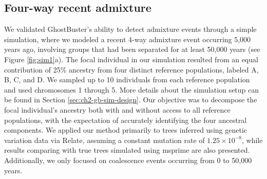\subsection{Four-way recent admixture}


We validated GhostBuster's ability to detect admixture events through a simple simulation, where we modeled a recent 4-way admixture event occurring 5,000 years ago, involving groups that had been separated for at least 50,000 years (see Figure \ref{fig:sim1}a). The focal individual in our simulation resulted from an equal contribution of 25\% ancestry from four distinct reference populations, labeled A, B, C, and D. We sampled up to 10 individuals from each reference population and used chromosomes 1 through 5. More details about the simulation setup can be found in Section \ref{sec:ch2-gb-sim-design}. Our objective was to decompose the focal individual's ancestry both with and without access to all reference populations, with the expectation of accurately identifying the four ancestral components. We applied our method primarily to trees inferred using genetic variation data via Relate, assuming a constant mutation rate of $1.25 \times 10^{-8}$, while results comparing with true trees simulated using msprime are also presented. Additionally, we only focused on coalescence events occurring from 0 to 50,000 years.


